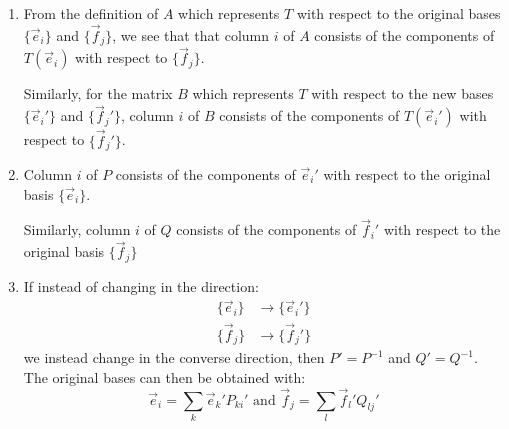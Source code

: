 \documentclass[../main.tex]{subfiles}
\begin{document}
\begin{remark}
  \begin{enumerate}
    \item From the definition of $A$ which represents $T$ with respect to the original bases $\{\vec{e}_i\}$ and $\{\vec{f}_j\}$, we see that  that column $i$ of $A$ consists of the components of $T(\vec{e}_i)$ with respect to $\{\vec{f}_j\}$.

      Similarly, for the matrix $B$ which represents $T$ with respect to the new bases $\{\vec{e}_i'\}$ and $\{\vec{f}_j'\}$,  column $i$ of $B$ consists of the components of $T(\vec{e}_i')$ with respect to $\{\vec{f}_j'\}$.
    \item Column $i$ of $P$ consists of the components of $\vec{e}_i'$ with respect to the original basis $\{\vec{e}_i\}$.

      Similarly, column $i$ of $Q$ consists of the components of $\vec{f}_i'$ with respect to the original basis $\{\vec{f}_j\}$
    \item If instead of changing in the direction:
      \begin{align*}
        \{\vec{e}_i\} &\to \{\vec{e}_i'\} \\
        \{\vec{f}_j\} &\to \{\vec{f}_j'\}
      \end{align*}
      we instead change in the converse direction, then $P' = P^{-1}$ and $Q' = Q^{-1}$.
      The original bases can then be obtained with:
      \[
        \vec{e}_i = \sum_{k} \vec{e}_k' P_{k i}' \text{ and } \vec{f}_j = \sum_{l} \vec{f}_l' Q_{l j}'
      \]
  \end{enumerate}
\end{remark}
\end{document}
